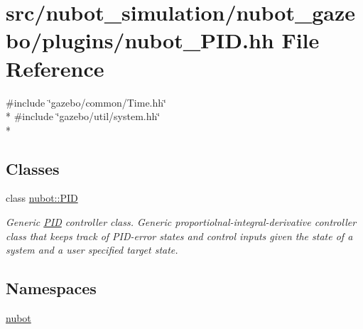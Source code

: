 \hypertarget{nubot__PID_8hh}{\section{src/nubot\-\_\-simulation/nubot\-\_\-gazebo/plugins/nubot\-\_\-\-P\-I\-D.hh File Reference}
\label{nubot__PID_8hh}
}
{\ttfamily \#include \char`\"{}gazebo/common/\-Time.\-hh\char`\"{}}\\*
{\ttfamily \#include \char`\"{}gazebo/util/system.\-hh\char`\"{}}\\*
\subsection*{Classes}
\begin{DoxyCompactItemize}
\item 
class \hyperlink{classnubot_1_1PID}{nubot\-::\-P\-I\-D}
\begin{DoxyCompactList}\small\item\em Generic \hyperlink{classnubot_1_1PID}{P\-I\-D} controller class. Generic proportiolnal-\/integral-\/derivative controller class that keeps track of P\-I\-D-\/error states and control inputs given the state of a system and a user specified target state. \end{DoxyCompactList}\end{DoxyCompactItemize}
\subsection*{Namespaces}
\begin{DoxyCompactItemize}
\item 
\hyperlink{namespacenubot}{nubot}
\end{DoxyCompactItemize}

